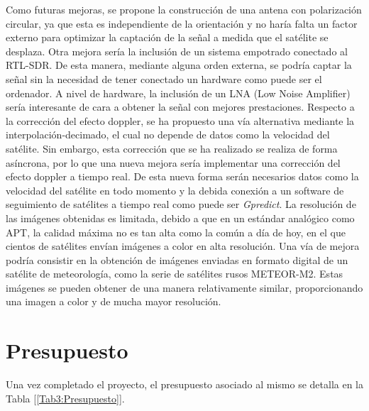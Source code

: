 \documentclass[a4paper,openright,12pt]{article}
\begin{document}
Como futuras mejoras, se propone la construcción de una antena con polarización circular, ya que esta es independiente de la orientación y no haría falta un factor externo para optimizar la captación de la señal a medida que el satélite se desplaza. 
Otra mejora sería la inclusión de un sistema empotrado conectado al RTL-SDR. De esta manera, mediante alguna orden externa, se podría captar la señal sin la necesidad de tener conectado un hardware como puede ser el ordenador. A nivel de hardware, la inclusión de un LNA (Low Noise Amplifier) sería interesante de cara a obtener la señal con mejores prestaciones.
Respecto a la corrección del efecto doppler, se ha propuesto una vía alternativa mediante la interpolación-decimado, el cual no depende de datos como la velocidad del satélite. Sin embargo, esta corrección que se ha realizado se realiza de forma asíncrona, por lo que una nueva mejora sería implementar una corrección del efecto doppler a tiempo real. De esta nueva forma serán necesarios datos como la velocidad del satélite en todo momento y la debida conexión a un software de seguimiento de satélites a tiempo real como puede ser \textit{Gpredict}.
La resolución de las imágenes obtenidas es limitada, debido a que en un estándar analógico como APT, la calidad máxima no es tan alta como la común a día de hoy, en el que cientos de satélites envían imágenes a color en alta resolución. Una vía de mejora podría consistir en la obtención de imágenes enviadas en formato digital de un satélite de meteorología, como la serie de satélites rusos METEOR-M2. Estas imágenes se pueden obtener de una manera relativamente similar, proporcionando una imagen a color y de mucha mayor resolución.

\section{Presupuesto}
Una vez completado el proyecto, el presupuesto asociado al mismo se detalla en la Tabla [\ref{Tab3:Presupuesto}].
\end{document}
